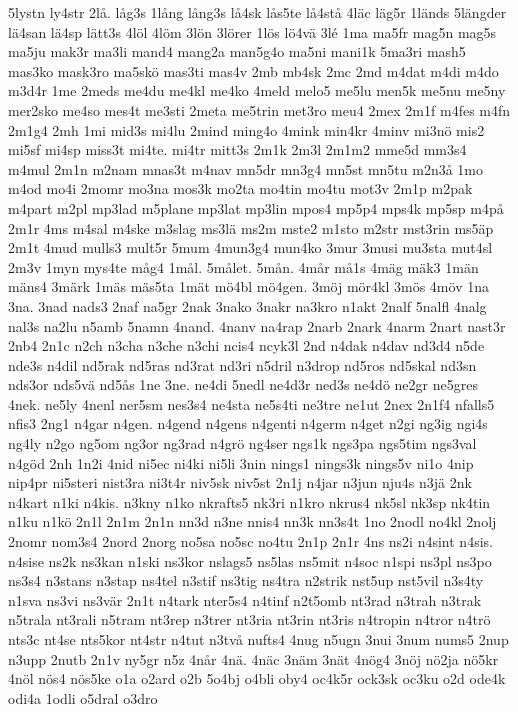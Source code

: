 {5lystn
ly4str
2lå.
låg3s
1lång
lång3s
lå4sk
lås5te
lå4stå
4läc
läg5r
1länds
5längder
lä4san
lä4sp
lätt3s
4löl
4löm
3lön
3lörer
1lös
lö4vä
3lé
1ma
ma5fr
mag5n
mag5s
ma5ju
mak3r
ma3li
mand4
mang2a
man5g4o
ma5ni
mani1k
5ma3ri
mash5
mas3ko
mask3ro
ma5skö
mas3ti
mas4v
2mb
mb4sk
2mc
2md
m4dat
m4di
m4do
m3d4r
1me
2meds
me4du
me4kl
me4ko
4meld
melo5
me5lu
men5k
me5nu
me5ny
mer2sko
me4so
mes4t
me3sti
2meta
me5trin
met3ro
meu4
2mex
2m1f
m4fes
m4fn
2m1g4
2mh
1mi
mid3s
mi4lu
2mind
ming4o
4mink
min4kr
4minv
mi3nö
mis2
mi5sf
mi4sp
miss3t
mi4te.
mi4tr
mitt3s
2m1k
2m3l
2m1m2
mme5d
mm3s4
m4mul
2m1n
m2nam
mnas3t
m4nav
mn5dr
mn3g4
mn5st
mn5tu
m2n3å
1mo
m4od
mo4i
2momr
mo3na
mos3k
mo2ta
mo4tin
mo4tu
mot3v
2m1p
m2pak
m4part
m2pl
mp3lad
m5plane
mp3lat
mp3lin
mpos4
mp5p4
mps4k
mp5sp
m4på
2m1r
4ms
m4sal
m4ske
m3slag
ms3lä
ms2m
mste2
m1sto
m2str
mst3rin
ms5äp
2m1t
4mud
mulls3
mult5r
5mum
4mun3g4
mun4ko
3mur
3musi
mu3sta
mut4sl
2m3v
1myn
mys4te
måg4
1mål.
5målet.
5mån.
4mår
må1s
4mäg
mäk3
1män
mäns4
3märk
1mäs
mäs5ta
1mät
mö4bl
mö4gen.
3möj
mör4kl
3mös
4möv
1na
3na.
3nad
nads3
2naf
na5gr
2nak
3nako
3nakr
na3kro
n1akt
2nalf
5nalfl
4nalg
nal3s
na2lu
n5amb
5namn
4nand.
4nanv
na4rap
2narb
2nark
4narm
2nart
nast3r
2nb4
2n1c
n2ch
n3cha
n3che
n3chi
ncis4
ncyk3l
2nd
n4dak
n4dav
nd3d4
n5de
nde3s
n4dil
nd5rak
nd5ras
nd3rat
nd3ri
n5dril
n3drop
nd5ros
nd5skal
nd3sn
nds3or
nds5vä
nd5ås
1ne
3ne.
ne4di
5nedl
ne4d3r
ned3s
ne4dö
ne2gr
ne5gres
4nek.
ne5ly
4nenl
ner5sm
nes3s4
ne4sta
ne5s4ti
ne3tre
ne1ut
2nex
2n1f4
nfalls5
nfis3
2ng1
n4gar
n4gen.
n4gend
n4gens
n4genti
n4germ
n4get
n2gi
ng3ig
ngi4s
ng4ly
n2go
ng5om
ng3or
ng3rad
n4grö
ng4ser
ngs1k
ngs3pa
ngs5tim
ngs3val
n4göd
2nh
1n2i
4nid
ni5ec
ni4ki
ni5li
3nin
nings1
nings3k
nings5v
ni1o
4nip
nip4pr
ni5steri
nist3ra
ni3t4r
niv5sk
niv5st
2n1j
n4jar
n3jun
nju4s
n3jä
2nk
n4kart
n1ki
n4kis.
n3kny
n1ko
nkrafts5
nk3ri
n1kro
nkrus4
nk5sl
nk3sp
nk4tin
n1ku
n1kö
2n1l
2n1m
2n1n
nn3d
n3ne
nnis4
nn3k
nn3s4t
1no
2nodl
no4kl
2nolj
2nomr
nom3s4
2nord
2norg
no5sa
no5sc
no4tu
2n1p
2n1r
4ns
ns2i
n4sint
n4sis.
n4sise
ns2k
ns3kan
n1ski
ns3kor
nslags5
ns5las
ns5mit
n4soc
n1spi
ns3pl
ns3po
ns3s4
n3stans
n3stap
ns4tel
n3stif
ns3tig
ns4tra
n2strik
nst5up
nst5vil
n3s4ty
n1sva
ns3vi
ns3vär
2n1t
n4tark
nter5s4
n4tinf
n2t5omb
nt3rad
n3trah
n3trak
n5trala
nt3rali
n5tram
nt3rep
n3trer
nt3ria
nt3rin
nt3ris
n4tropin
n4tror
n4trö
nts3c
nt4se
nts5kor
nt4str
n4tut
n3två
nufts4
4nug
n5ugn
3nui
3num
nums5
2nup
n3upp
2nutb
2n1v
ny5gr
n5z
4når
4nä.
4näc
3näm
3nät
4nög4
3nöj
nö2ja
nö5kr
4nöl
nös4
nös5ke
o1a
o2ard
o2b
5o4bj
o4bli
oby4
oc4k5r
ock3sk
oc3ku
o2d
ode4k
odi4a
1odli
o5dral
o3dro
}

